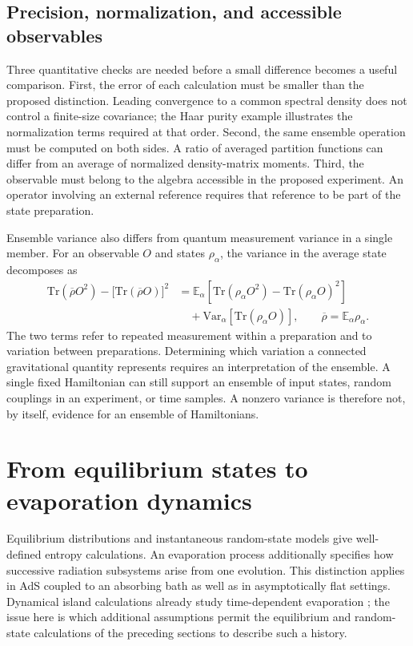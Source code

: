\documentclass[11pt,letterpaper]{article}
\theoremstyle{plain}
\theoremstyle{definition}
\theoremstyle{remark}
\newcommand{\E}{\mathbb{E}}
\newcommand{\Var}{\text{Var}}
\begin{document}
\subsection{Precision, normalization, and accessible observables}

Three quantitative checks are needed before a small difference becomes
a useful comparison. First, the error of each calculation must be
smaller than the proposed distinction. Leading convergence to a common
spectral density does not control a finite-size covariance; the Haar
purity example illustrates the normalization terms required at that
order. Second, the same ensemble operation must be computed on both
sides. A ratio of averaged partition functions can differ from an
average of normalized density-matrix moments. Third, the observable
must belong to the algebra accessible in the proposed experiment.
An operator involving an external reference requires that reference
to be part of the state preparation.

Ensemble variance also differs from quantum measurement variance in a
single member. For an observable $O$ and states $\rho_\alpha$, the
variance in the average state decomposes as
\begin{align}
 \mathrm{Tr}(\overline\rho O^2)
 -\bigl[\mathrm{Tr}(\overline\rho O)\bigr]^2
 &=\E_\alpha\left[\mathrm{Tr}(\rho_\alpha O^2)
       -\mathrm{Tr}(\rho_\alpha O)^2\right]
 \nonumber\\
 &\quad+\Var_\alpha\left[\mathrm{Tr}(\rho_\alpha O)\right],
 \qquad \overline\rho=\E_\alpha\rho_\alpha.
 \label{eq07:variance_decomposition}
\end{align}
The two terms refer to repeated measurement within a preparation and
to variation between preparations. Determining which variation a
connected gravitational quantity represents requires an interpretation
of the ensemble. A single fixed Hamiltonian can still support an
ensemble of input states, random couplings in an experiment, or time
samples. A nonzero variance is therefore not, by itself, evidence for
an ensemble of Hamiltonians.

\section{From equilibrium states to evaporation dynamics}
\label{sec08:equilibrium_evaporation}

Equilibrium distributions and instantaneous random-state models give
well-defined entropy calculations. An evaporation process additionally
specifies how successive radiation subsystems arise from one evolution.
This distinction applies in AdS coupled to an absorbing bath as well as
in asymptotically flat settings. Dynamical island calculations already
study time-dependent evaporation
\citep{almheirietal2019,almheirietal2020page}; the issue here is which
additional assumptions permit the equilibrium and random-state
calculations of the preceding sections to describe such a history.
\end{document}
